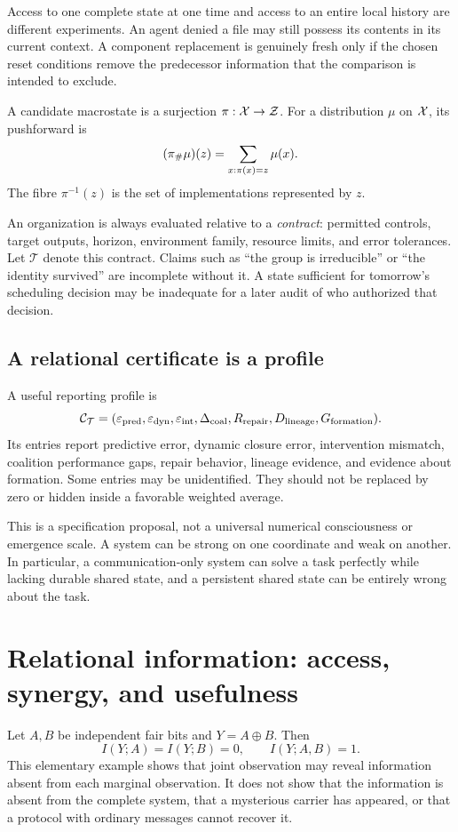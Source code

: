 Access to one complete state at one time and access to an entire local history are different experiments. An agent denied a file may still possess its contents in its current context. A component replacement is genuinely fresh only if the chosen reset conditions remove the predecessor information that the comparison is intended to exclude.

\begin{MSdefinition}\label{MS:def:macrostate}
A candidate macrostate is a surjection $\pi:\mathcal X\to\mathcal Z$. For a distribution $\mu$ on $\mathcal X$, its pushforward is
\[
(\pi_{\#}\mu)(z)=\sum_{x:\pi(x)=z}\mu(x).
\]
The fibre $\pi^{-1}(z)$ is the set of implementations represented by $z$.
\end{MSdefinition}

An organization is always evaluated relative to a \emph{contract}: permitted controls, target outputs, horizon, environment family, resource limits, and error tolerances. Let $\mathcal T$ denote this contract. Claims such as ``the group is irreducible'' or ``the identity survived'' are incomplete without it. A state sufficient for tomorrow's scheduling decision may be inadequate for a later audit of who authorized that decision.

\subsection{A relational certificate is a profile}
A useful reporting profile is
\[
\mathcal C_{\mathcal T}=(\varepsilon_{\rm pred},\varepsilon_{\rm dyn},\varepsilon_{\rm int},
\Delta_{\rm coal},R_{\rm repair},D_{\rm lineage},G_{\rm formation}).
\]
Its entries report predictive error, dynamic closure error, intervention mismatch, coalition performance gaps, repair behavior, lineage evidence, and evidence about formation. Some entries may be unidentified. They should not be replaced by zero or hidden inside a favorable weighted average.

This is a specification proposal, not a universal numerical consciousness or emergence scale. A system can be strong on one coordinate and weak on another. In particular, a communication-only system can solve a task perfectly while lacking durable shared state, and a persistent shared state can be entirely wrong about the task.

\section{Relational information: access, synergy, and usefulness}\label{MS:sec:information}
Let $A,B$ be independent fair bits and $Y=A\oplus B$. Then
\[
I(Y;A)=I(Y;B)=0,\qquad I(Y;A,B)=1.
\]
This elementary example shows that joint observation may reveal information absent from each marginal observation. It does not show that the information is absent from the complete system, that a mysterious carrier has appeared, or that a protocol with ordinary messages cannot recover it.

